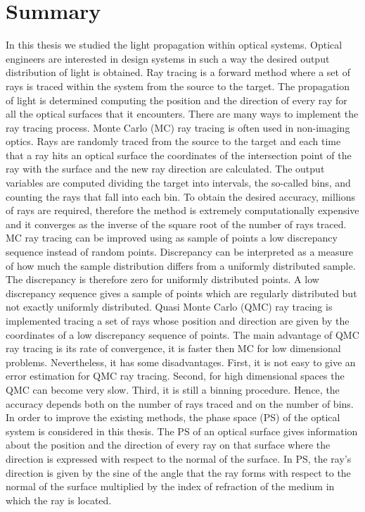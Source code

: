 \chapter*{Summary}
\markboth{}{}
In this thesis we studied the light propagation within optical systems.
Optical engineers are interested in design systems in such a way the desired output distribution of light is obtained. Ray tracing is a forward method where a set of rays is traced within the system from the source to the target. The propagation of light is determined computing the position and the direction of every ray for all the optical surfaces that it encounters. There are many ways to implement the ray tracing process. Monte Carlo (MC) ray tracing is often used in non-imaging optics. Rays are randomly traced from the source to the target and each time that a ray hits an optical surface the coordinates of the intersection point of the ray with the surface and the new ray direction are calculated. The output variables are computed dividing the target into intervals, the so-called bins, and counting the rays that fall into each bin. To obtain the desired accuracy, millions of rays are required, therefore the method is extremely computationally expensive and it converges as the inverse of the square root of the number of rays traced. 
\\ \indent 
MC ray tracing can be improved using as sample of points a low discrepancy sequence instead of random points. Discrepancy can be interpreted as a measure of how much the sample distribution differs from a uniformly distributed sample. The discrepancy is therefore zero for uniformly distributed points. A low discrepancy sequence gives a sample of points which are regularly distributed but not exactly uniformly distributed. Quasi Monte Carlo (QMC) ray tracing is implemented tracing a set of rays whose position and direction are given by the coordinates of a low discrepancy sequence of points.
The main advantage of QMC ray tracing is its rate of convergence, it is faster then MC for low dimensional problems. Nevertheless, it has some disadvantages. First, it is not easy to give an error estimation for QMC ray tracing. Second, for high dimensional spaces the QMC can become very slow. Third, it is still a binning procedure. Hence, the accuracy depends both on the number of rays traced and on the number of bins.
\\ \indent
In order to improve the existing methods, the phase space (PS) of the optical system is considered in this thesis. The PS of an optical surface gives information about the position and the direction of every ray on that surface where the direction is expressed with respect to the normal of the surface. In PS, the ray's direction is given by the sine of the angle that the ray forms with respect to the normal of the surface multiplied by the index of refraction of the medium in which the ray is located.
